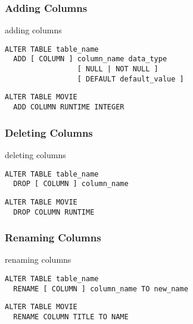 \documentclass[dvipsnames]{beamer}
\theoremstyle{plain}
\begin{document}
\begin{frame}[fragile]
  \frametitle{Adding Columns}

  \begin{block}{adding columns}
    \begin{lstlisting}
ALTER TABLE table_name
  ADD [ COLUMN ] column_name data_type
                 [ NULL | NOT NULL ]
                 [ DEFAULT default_value ]
    \end{lstlisting}
  \end{block}

  \pause
  \medskip
  \begin{example}
    \begin{lstlisting}
ALTER TABLE MOVIE
  ADD COLUMN RUNTIME INTEGER
    \end{lstlisting}
  \end{example}
\end{frame}

\begin{frame}[fragile]
  \frametitle{Deleting Columns}

  \begin{block}{deleting columns}
    \begin{lstlisting}
ALTER TABLE table_name
  DROP [ COLUMN ] column_name
    \end{lstlisting}
  \end{block}

  \pause
  \medskip
  \begin{example}
    \begin{lstlisting}
ALTER TABLE MOVIE
  DROP COLUMN RUNTIME
    \end{lstlisting}
  \end{example}
\end{frame}

\begin{frame}[fragile]
  \frametitle{Renaming Columns}

  \begin{block}{renaming columns}
    \begin{lstlisting}
ALTER TABLE table_name
  RENAME [ COLUMN ] column_name TO new_name
    \end{lstlisting}
  \end{block}

  \pause
  \medskip
  \begin{example}
    \begin{lstlisting}
ALTER TABLE MOVIE
  RENAME COLUMN TITLE TO NAME
    \end{lstlisting}
  \end{example}
\end{frame}
\end{document}

